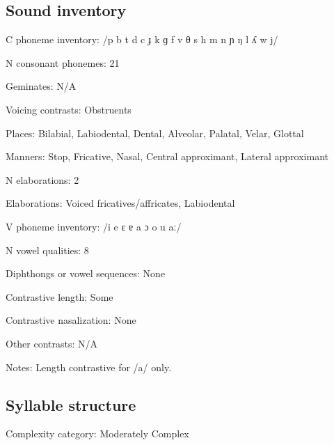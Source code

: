 {\subsection*{Sound inventory}
\begin{appendixdesc}

\item[C phoneme inventory:] /p b t d c ɟ k ɡ f v θ s h m n ɲ ŋ l ʎ w j/

\item[N consonant phonemes:] 21

\item[Geminates:] N/A

\item[Voicing contrasts:] Obstruents

\item[Places:] Bilabial, Labiodental, Dental, Alveolar, Palatal, Velar, Glottal

\item[Manners:] Stop, Fricative, Nasal, Central approximant, Lateral approximant

\item[N elaborations:] 2

\item[Elaborations:] Voiced fricatives/affricates, Labiodental

\item[V phoneme inventory:] /i e ɛ ɐ a ɔ o u aː/

\item[N vowel qualities:] 8

\item[Diphthongs or vowel sequences:] None

\item[Contrastive length:] Some

\item[Contrastive nasalization:] None

\item[Other contrasts:] N/A

\item[Notes:] Length contrastive for /a/ only.
\end{appendixdesc}
\subsection*{Syllable structure}
\begin{appendixdesc}

\item[Complexity category:] Moderately Complex


\end{appendixdesc}}
